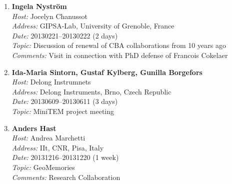 \begin{enumerate}
\item 
{\bf Ingela Nystr\"{o}m}~\\
{\em Host:} Jocelyn Chanussot~\\
{\em Address:} GIPSA-Lab, University of Grenoble, France~\\
{\em Date:} 20130221--20130222 (2 days)~\\
{\em Topic:} Discussion of renewal of CBA collaborations from 10 years ago~\\
{\em Comments:} Visit in connection with PhD defense of Francois Cokelaer

\item 
{\bf Ida-Maria Sintorn, Gustaf Kylberg, Gunilla Borgefors}~\\
{\em Host:} Delong Instrumnets~\\
{\em Address:} Delong Instruments, Brno, Czech Republic~\\
{\em Date:} 20130609--20130611 (3 days)~\\
{\em Topic:} MiniTEM project meeting

\item 
{\bf Anders Hast}~\\
{\em Host:} Andrea Marchetti~\\
{\em Address:} IIt, CNR, Pisa, Italy~\\
{\em Date:} 20131216--20131220 (1 week)~\\
{\em Topic:} GeoMemories~\\
{\em Comments:} Research Collaboration

\end{enumerate}





